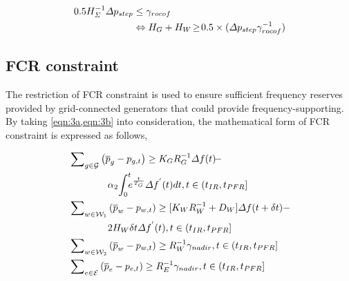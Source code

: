 \documentclass[lettersize,journal]{IEEEtran}
\begin{document}
\vspace{-0.125in}
\begin{small}
	\begin{align}\label{eqn:10}
		0.5{H_{\varSigma}^{-1}}{\varDelta p_{{step}}} & \leq \gamma_{rocof}                                                                                   \\
		\quad\,\,\,                                   & \Leftrightarrow H_{G} + H_{W}\!\geq\! 0.5 \times ({\varDelta p_{{step} }} \gamma_{rocof}^{-1}) \notag
	\end{align}
\end{small}

\vspace{-0.15in}

\subsection{FCR constraint}

The restriction of FCR constraint is used to ensure sufficient frequency reserves provided by grid-connected generators that could provide frequency-supporting. By taking \cref{eqn:3a,eqn:3b} into consideration, the mathematical form of FCR constraint is expressed as follows,

\vspace{-0.125in}
\begin{newsubequations}
	\label{eqn:11}
	\begin{align}
		 & \sum\nolimits_{g\in\mathcal{G}} \left( \overline{p}_{g} -p_{g, t}\right) \geq{K_{G} }{ R_{G}^{-1}} \varDelta f(t) \!- \label{eqn:11a}            \\
		 & \qquad \qquad \alpha_2 \!\int_{0}^{t} \!\!\! e^{\frac{t}{T_G}} \!\!\ \varDelta f^{'}(t)dt,t \in (t_{IR}, t_{PFR}]\notag                          \\
		 & \sum\nolimits_{w\in\mathcal{W}_{1}} \left( \overline{p}_{w} - p_{w, t} \right) \geq [K_{W}R_{W}^{-1} + D_{W}]\varDelta f(t+\delta t) -  \notag   \\
		 & \qquad\qquad 2H_W \delta t \varDelta f^{'}(t), t \in (t_{IR}, t_{PFR}] \label{eqn:11b}                                                           \\
		 & \sum\nolimits_{w\in\mathcal{W}_{2}} \left( \overline{p}_{w} - p_{w, t} \right) \geq R_{W}^{-1} \gamma_{nadir},t \in (t_{IR}, t_{PFR}] \label{eqn:11c} \\
		 & \sum\nolimits_{e\in\mathcal{E}} \left( \overline{p}_{e} -p_{e, t}\right)  \geq R_{E}^{-1} \gamma_{nadir},t \in (t_{IR}, t_{PFR}] \label{eqn:11d}
	\end{align}\end{newsubequations}
\end{document}
